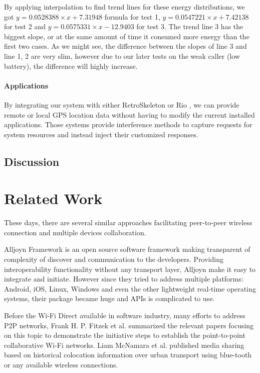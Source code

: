 \documentclass[conference]{IEEEtran}
\begin{document}
By applying interpolation to find trend lines for these energy distributions, we got $y = 0.0528388 \times x + 7.31948$ formula for test 1, $y = 0.0547221 \times x + 7.42138$ for test 2 and $y = 0.0575331 \times x - 12.9403$ for test 3. The trend line 3 has the biggest slope, or at the same amount of time it consumed more energy than the first two cases. As we might see, the difference between the slopes of line 3 and line 1, 2 are very slim, however due to our later tests on the weak caller (low battery), the difference will highly increase. 

\paragraph{Applications}
By integrating our system with either RetroSkeleton \cite{retro-skel} or Rio \cite{rio}, we can provide remote or local GPS location data without having to modify the current installed applications. Those systems provide interference methods to capture requests for system resources and instead inject their customized responses. 

\subsection{Discussion}

\section{Related Work}
\label{sec:related}
These days, there are several similar approaches facilitating peer-to-peer wireless connection and multiple devices collaboration. 

Alljoyn Framework \cite{alljoyn} is an open source software framework making transparent of complexity of discover and communication to the developers. Providing interoperability functionality without any transport layer, Alljoyn make it easy to integrate and initiate. However since they tried to address multiple platforms: Android, iOS, Linux, Windows and even the other lightweight real-time operating systems, their package became huge and APIs is complicated to use. 

Before the Wi-Fi Direct available in software industry, many efforts to address P2P networks, Frank H. P. Fitzek et al. \cite{m_p2p_tutor} summarized the relevant papers focusing on this topic to demonstrate the initiative steps to establish the point-to-point collaborative Wi-Fi networks. Liam McNamara et al. published \cite{media_share} media sharing based on historical colocation information over urban transport using blue-tooth or any available wireless connections.
\end{document}
